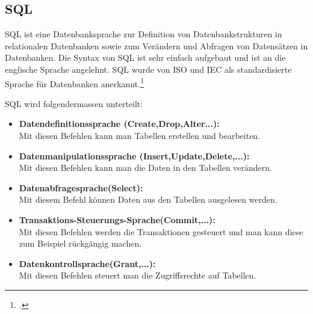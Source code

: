 \subsection{SQL}
SQL ist eine Datenbanksprache zur Definition von Datenbankstrukturen in relationalen Datenbanken sowie zum Verändern und Abfragen von Datensätzen in Datenbanken. Die Syntax von SQL ist sehr einfach aufgebaut und ist an die englische Sprache angelehnt. SQL wurde von ISO und IEC als standardisierte Sprache für Datenbanken anerkannt.\footcite[vgl.][]{sql}

SQL wird folgendermassen unterteilt:
\begin{itemize}
\item \textbf{Datendefinitionssprache (Create,Drop,Alter...):}\\
Mit diesen Befehlen kann man Tabellen erstellen und bearbeiten.

\item \textbf{Datenmanipulationssprache (Insert,Update,Delete,...):}\\
Mit diesen Befehlen kann man die Daten in den Tabellen verändern.

\item  \textbf{Datenabfragesprache(Select):}\\
Mit diesem Befehl können Daten aus den Tabellen ausgelesen werden.

\item  \textbf{Transaktions-Steuerungs-Sprache(Commit,...):}\\
Mit diesen Befehlen werden die Transaktionen gesteuert und man kann diese zum Beispiel rückgängig machen.

\item  \textbf{Datenkontrollsprache(Grant,...):}\\
Mit diesen Befehlen steuert man die Zugriffsrechte auf Tabellen.
\end{itemize}
